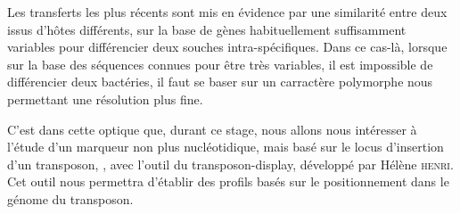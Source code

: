 Les transferts les plus récents sont mis en évidence par une similarité entre deux  issus d'hôtes différents, sur la base de gènes habituellement suffisamment variables pour différencier deux souches intra-spécifiques.
Dans ce cas-là, lorsque sur la base des séquences connues pour être très variables, il est impossible de différencier deux bactéries, il faut se baser sur un carractère polymorphe nous permettant une résolution plus fine.

C'est dans cette optique que, durant ce stage, nous allons nous intéresser à l'étude  d'un marqueur non plus nucléotidique, mais basé sur le locus d'insertion d'un transposon, , avec l'outil du transposon-display, développé par Hélène \textsc{henri}\cite{memHH}. 
Cet outil nous permettra d'établir des profils basés sur le positionnement dans le génome du transposon.